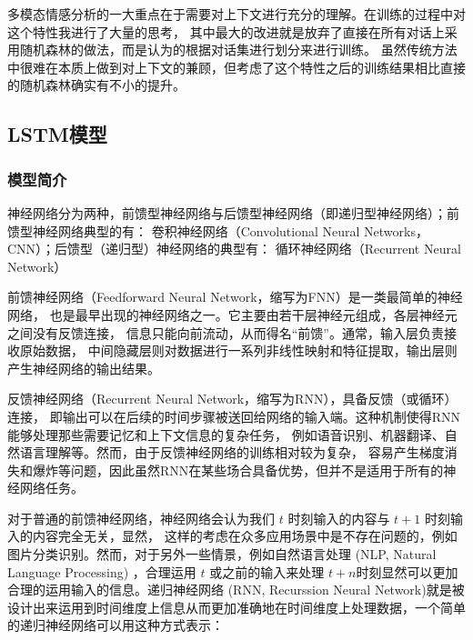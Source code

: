 \documentclass[11pt]{article}
\begin{document}
            多模态情感分析的一大重点在于需要对上下文进行充分的理解。在训练的过程中对这个特性我进行了大量的思考，
            其中最大的改进就是放弃了直接在所有对话上采用随机森林的做法，而是认为的根据对话集进行划分来进行训练。
            虽然传统方法中很难在本质上做到对上下文的兼顾，但考虑了这个特性之后的训练结果相比直接的随机森林确实有不小的提升。

        \subsection{LSTM模型}
            \subsubsection{模型简介}
            神经网络分为两种，前馈型神经网络与后馈型神经网络（即递归型神经网络）；前馈型神经网络典型的有：
            卷积神经网络（Convolutional Neural Networks，CNN）；后馈型（递归型）神经网络的典型有：
            循环神经网络（Recurrent Neural Network）
            
            前馈神经网络（Feedforward Neural Network，缩写为FNN）是一类最简单的神经网络，
            也是最早出现的神经网络之一。它主要由若干层神经元组成，各层神经元之间没有反馈连接，
            信息只能向前流动，从而得名“前馈”。通常，输入层负责接收原始数据，
            中间隐藏层则对数据进行一系列非线性映射和特征提取，输出层则产生神经网络的输出结果。
            
            反馈神经网络（Recurrent Neural Network，缩写为RNN），具备反馈（或循环）连接，
            即输出可以在后续的时间步骤被送回给网络的输入端。这种机制使得RNN能够处理那些需要记忆和上下文信息的复杂任务，
            例如语音识别、机器翻译、自然语言理解等。然而，由于反馈神经网络的训练相对较为复杂，
            容易产生梯度消失和爆炸等问题，因此虽然RNN在某些场合具备优势，但并不是适用于所有的神经网络任务。
            
            对于普通的前馈神经网络，神经网络会认为我们 $t$ 时刻输入的内容与 $t+1$ 时刻输入的内容完全无关，显然，
            这样的考虑在众多应用场景中是不存在问题的，例如图片分类识别。然而，对于另外一些情景，例如自然语言处理 
            (NLP, Natural Language Processing) ，合理运用 $t$ 或之前的输入来处理 $t+n$时刻显然可以更加合理的运用输入的信息。递归神经网络 (RNN, Recurssion Neural Network)就是被设计出来运用到时间维度上信息从而更加准确地在时间维度上处理数据，一个简单的递归神经网络可以用这种方式表示：
            
\end{document}
